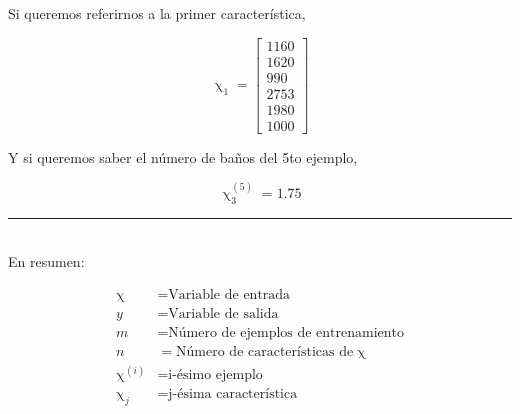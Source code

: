 \documentclass[twoside,twocolumn]{article}
\begin{document}
          Si queremos referirnos a la primer característica,

          \[
            \upchi_1
            =
            \begin{bmatrix}
              1160 \\
              1620 \\
              990 \\
              2753 \\
              1980 \\
              1000
            \end{bmatrix}
          \]

          Y si queremos saber el número de baños del 5to ejemplo, 

          \[
            \upchi^{(5)}_3
            =
            1.75
          \]

          \noindent\rule{\columnwidth}{0.4pt}\\

          En resumen:

          \begin{align*}
            \upchi &= \text{Variable de entrada}\\
            y &= \text{Variable de salida}\\
            m &= \text{Número de ejemplos de entrenamiento}\\
            n &= \text{Número de características de} \upchi\\
            \upchi^{(i)} &= \text{i-ésimo ejemplo}\\
            \upchi_j &= \text{j-ésima característica}
          \end{align*}
  
  
  
  
\end{document}
